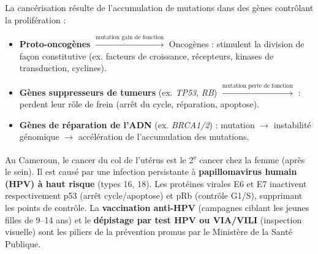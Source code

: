 \documentclass[11pt]{article}
\newcommand{\cle}[1]{{\popxbold\color{popdark}#1}}
\begin{document}
\begin{propriete}
La cancérisation résulte de l'accumulation de \cle{mutations} dans des gènes contrôlant la prolifération :
\begin{itemize}
\item \textbf{Proto-oncogènes} $\xrightarrow{\text{mutation gain de fonction}}$ \cle{Oncogènes} : stimulent la division de façon constitutive (ex. facteurs de croissance, récepteurs, kinases de transduction, cyclines).
\item \textbf{Gènes suppresseurs de tumeurs} (ex. \emph{TP53}, \emph{RB}) $\xrightarrow{\text{mutation perte de fonction}}$ : perdent leur rôle de frein (arrêt du cycle, réparation, apoptose).
\item \textbf{Gènes de réparation de l'ADN} (ex. \emph{BRCA1/2}) : mutation $\rightarrow$ instabilité génomique $\rightarrow$ accélération de l'accumulation des mutations.
\end{itemize}
\end{propriete}

\begin{savaistu}
Au Cameroun, le cancer du col de l'utérus est le 2\textsuperscript{e} cancer chez la femme (après le sein). Il est causé par une infection persistante à \textbf{papillomavirus humain (HPV) à haut risque} (types 16, 18). Les protéines virales E6 et E7 inactivent respectivement p53 (arrêt cycle/apoptose) et pRb (contrôle G1/S), supprimant les points de contrôle. La \textbf{vaccination anti-HPV} (campagnes ciblant les jeunes filles de 9--14 ans) et le \textbf{dépistage par test HPV ou VIA/VILI} (inspection visuelle) sont les piliers de la prévention promus par le Ministère de la Santé Publique.
\end{savaistu}
\end{document}
